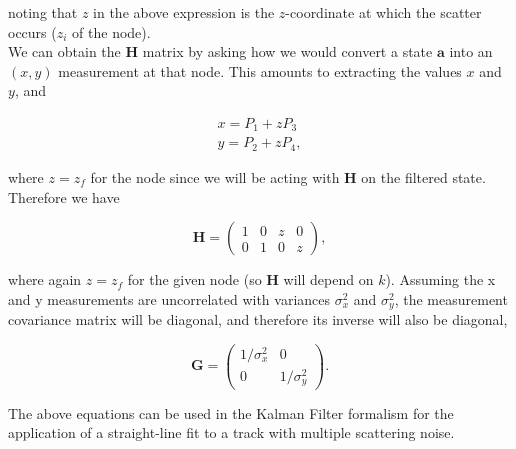 \documentclass[10pt]{article}
\begin{document}
\noindent noting that $z$ in the above expression is the $z$-coordinate at which the scatter occurs ($z_{i}$ of the node).\\

\noindent We can obtain the $\mathbf{H}$ matrix by asking how we would convert a state $\mathbf{a}$ into an $(x,y)$ measurement at that node.  This
amounts to extracting the values $x$ and $y$, and

\begin{equation}
\begin{split}
 x = P_{1} + zP_{3}\\
 y = P_{2} + zP_{4},
\end{split}
\end{equation}

\noindent where $z = z_{f}$ for the node since we will be acting with $\mathbf{H}$ on the filtered state.  Therefore we have

\begin{equation}
 \mathbf{H} = \left(\begin{array}{cccc} 1 & 0 & z & 0\\ 0 & 1 & 0 & z\end{array} \right),
\end{equation}

\noindent where again $z = z_{f}$ for the given node (so $\mathbf{H}$ will depend on $k$).  Assuming the x and y measurements are uncorrelated with
variances $\sigma_{x}^{2}$ and $\sigma_{y}^{2}$, the measurement covariance matrix will be diagonal, and therefore its inverse will also be diagonal,

\begin{equation}
 \mathbf{G} = \left(\begin{array}{cc} 1/\sigma_{x}^{2} & 0\\ 0 & 1/\sigma_{y}^{2}\end{array}\right).
\end{equation}

\noindent The above equations can be used in the Kalman Filter formalism for the application of a straight-line fit to a track with multiple scattering noise.


\end{document}
